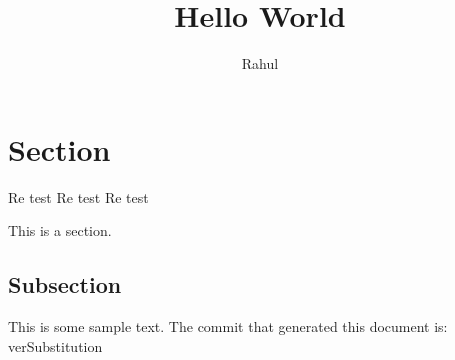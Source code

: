 \documentclass[12pt]{article}
\title{Hello World}
\author{Rahul}
\begin{document}
\maketitle

\section{Section}

Re test Re test Re test

This is a section. 

\subsection{Subsection}

This is some sample text.
The commit that generated this document is: verSubstitution
\end{document}
